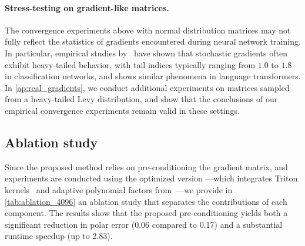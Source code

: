 \paragraph{Stress-testing on gradient-like matrices.} The convergence experiments above with normal distribution matrices may not fully reflect the statistics of gradients encountered during neural network training. In particular, empirical studies by~\cite{Simsekli2019TailIndex} have shown that stochastic gradients often exhibit heavy-tailed behavior, with tail indices typically ranging from $1.0$ to $1.8$ in classification networks, and \cite{kunstner2024heavy} shows similar phenomena in language transformers. 
In \cref{ap:real_gradients}, we conduct additional experiments on matrices sampled from a heavy-tailed Levy distribution, and show that the conclusions of our empirical convergence experiments remain valid in these settings.

\subsection{Ablation study}

Since the proposed method relies on pre-conditioning the gradient matrix, and experiments are conducted using the optimized version \color{dioncolor}{Muon+}\color{black}—which integrates Triton kernels~\cite{tillet2019triton} and adaptive polynomial factors from~\cite{cesista2025muonoptcoeffs}—we provide in \cref{tab:ablation_4096} an ablation study that separates the contributions of each component. The results show that the proposed pre-conditioning yields both a significant reduction in polar error (0.06 compared to 0.17) and a substantial runtime speedup (up to 2.83).

